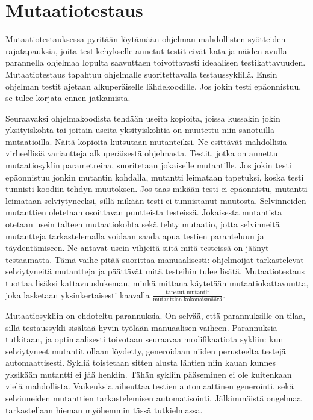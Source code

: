 \documentclass[finnish]{tktltiki2}
\begin{document}
\section{Mutaatiotestaus}
Mutaatiotestauksessa pyritään löytämään ohjelman mahdollisten syötteiden rajatapauksia, joita testikehykselle annetut testit eivät kata ja näiden avulla parannella ohjelmaa lopulta saavuttaen toivottavasti ideaalisen testikattavuuden. Mutaatiotestaus tapahtuu ohjelmalle suoritettavalla testaussyklillä. Ensin ohjelman testit ajetaan alkuperäiselle lähdekoodille. Jos jokin testi epäonnistuu, se tulee korjata ennen jatkamista.

Seuraavaksi ohjelmakoodista tehdään useita kopioita, joissa kussakin jokin yksityiskohta tai joitain useita yksityiskohtia on muutettu niin sanotuilla mutaatioilla. Näitä kopioita kutsutaan mutanteiksi. Ne esittävät mahdollisia virheellisiä variantteja alkuperäisestä ohjelmasta. Testit, jotka on annettu mutaatiosyklin parametreina, suoritetaan jokaiselle mutantille. Jos jokin testi epäonnistuu jonkin mutantin kohdalla, mutantti leimataan tapetuksi, koska testi tunnisti koodiin tehdyn muutoksen. Jos taas mikään testi ei epäonnistu, mutantti leimataan selviytyneeksi, sillä mikään testi ei tunnistanut muutosta. Selvinneiden mutanttien oletetaan osoittavan puutteista testeissä. Jokaisesta mutantista otetaan usein talteen mutaatiokohta sekä tehty mutaatio, jotta selvinneitä mutantteja tarkastelemalla voidaan saada apua testien paranteluun ja täydentämiseen. Ne antavat usein vihjeitä siitä mitä testeissä on jäänyt testaamatta. Tämä vaihe pitää suorittaa manuaalisesti: ohjelmoijat tarkastelevat selviytyneitä mutantteja ja päättävät mitä testeihin tulee lisätä. Mutaatiotestaus tuottaa lisäksi kattavuuslukeman, minkä mittana käytetään mutaatiokattavuutta, joka lasketaan yksinkertaisesti kaavalla $\frac{\text{tapetut mutantit}}{\text{mutanttien kokonaismäärä}}$.

Mutaatiosykliin on ehdoteltu parannuksia. On selvää, että parannuksille on tilaa, sillä testaussykli sisältää hyvin työlään manuaalisen vaiheen. Parannuksia tutkitaan, ja optimaalisesti toivotaan seuraavaa modifikaatiota sykliin: kun selviytyneet mutantit ollaan löydetty, generoidaan niiden perusteelta testejä automaattisesti. Sykliä toistetaan sitten alusta lähtien niin kauan kunnes yksikään mutantti ei jää henkiin. Tähän sykliin pääseminen ei ole kuitenkaan vielä mahdollista. Vaikeuksia aiheuttaa testien automaattinen generointi, sekä selvinneiden mutanttien tarkastelemisen automatisointi. Jälkimmäistä ongelmaa tarkastellaan hieman myöhemmin tässä tutkielmassa.
\end{document}
